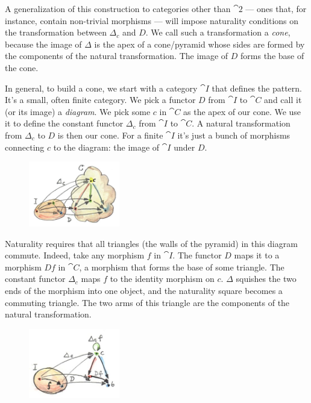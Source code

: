 \noindent
A generalization of this construction to categories other than
$\cat{2}$ --- ones that, for instance, contain non-trivial morphisms
--- will impose naturality conditions on the transformation between
$\Delta_c$ and $D$. We call such a transformation a \emph{cone},
because the image of $\Delta$ is the apex of a cone/pyramid whose sides are
formed by the components of the natural transformation. The image of $D$
forms the base of the cone.

In general, to build a cone, we start with a category $\cat{I}$ that
defines the pattern. It's a small, often finite category. We pick a
functor $D$ from $\cat{I}$ to $\cat{C}$ and call it (or its image) a
\emph{diagram}. We pick some $c$ in $\cat{C}$ as the apex of our
cone. We use it to define the constant functor $\Delta_c$ from
$\cat{I}$ to $\cat{C}$. A natural transformation from $\Delta_c$
to $D$ is then our cone. For a finite $\cat{I}$ it's just a bunch of
morphisms connecting $c$ to the diagram: the image of $\cat{I}$
under $D$.

\begin{figure}[H]
\centering
\includegraphics[width=1.56250in]{images/cone.jpg}
\end{figure}

\noindent
Naturality requires that all triangles (the walls of the pyramid) in
this diagram commute. Indeed, take any morphism $f$ in $\cat{I}$.
The functor $D$ maps it to a morphism $D f$ in $\cat{C}$, a
morphism that forms the base of some triangle. The constant functor
$\Delta_c$ maps $f$ to the identity morphism on
$c$. $\Delta$ squishes the two ends of the morphism into one object, and
the naturality square becomes a commuting triangle. The two arms of this
triangle are the components of the natural transformation.

\begin{figure}[H]
\centering
\includegraphics[width=1.56250in]{images/conenaturality.jpg}
\end{figure}

